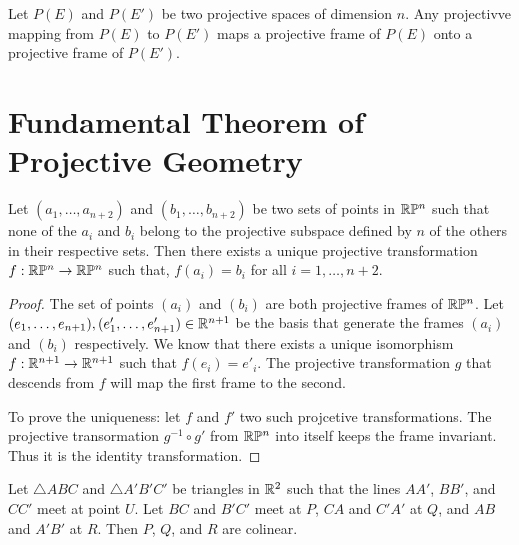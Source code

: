 \begin{prop}
  Let $P(E)$ and $P(E')$ be two projective spaces of dimension $n$. Any projectivve mapping from
  $P(E)$ to $P(E')$ maps a projective frame of $P(E)$ onto a projective frame of $P(E')$.
\end{prop}

\section{Fundamental Theorem of Projective Geometry}

\begin{theorem}
  \label{thm:fundprojgeo}
  Let $(a_1,\ldots,a_{n+2})$ and $(b_1,\ldots,b_{n+2})$ be two sets of points in $\mathbb{R}\mathbb{P}^n$ such
  that none of the $a_i$ and $b_i$ belong to the projective subspace defined by $n$ of the others
  in their respective sets. Then there exists a unique projective transformation
  $f:\mathbb{R}\mathbb{P}^n\rightarrow\mathbb{R}\mathbb{P}^n$ such that, $f(a_i)=b_i$ for all $i=1,\ldots,n+2$.
\end{theorem}

\begin{proof}
  The set of points $(a_i)$ and $(b_i)$ are both projective frames of $\mathbb{R}\mathbb{P}^n$. Let
  $(e_1,\ldots,e_{n+1}),(e'_1,\ldots,e'_{n+1})\in\mathbb{R}^{n+1}$ be the basis that generate the frames
  $(a_i)$ and $(b_i)$ respectively. We know that there exists a unique isomorphism
  $f:\mathbb{R}^{n+1}\rightarrow\mathbb{R}^{n+1}$ such that $f(e_i)=e'_i$. The projective transformation $g$
  that descends from $f$ will map the first frame to the second.

  To prove the uniqueness: let $f$ and $f'$ two such projcetive transformations. The projective
  transormation $g^{-1}\circ g'$ from $\mathbb{R}\mathbb{P}^n$ into itself keeps the frame invariant. Thus
  it is the identity transformation.
\end{proof}

\begin{theorem}
  Let $\triangle ABC$ and $\triangle A'B'C'$ be triangles in $\mathbb{R}^2$ such that the lines $AA'$,
  $BB'$, and $CC'$ meet at point $U$. Let $BC$ and $B'C'$ meet at $P$, $CA$ and $C'A'$ at $Q$,
  and $AB$ and $A'B'$ at $R$. Then $P$, $Q$, and $R$ are colinear.
\end{theorem}

